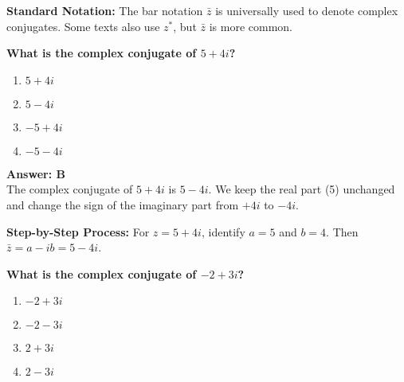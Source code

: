 \documentclass[12pt,a4paper]{article}
\begin{document}
\begin{conceptbox}
\textbf{Standard Notation:} The bar notation \( \bar{z} \) is universally used to denote complex conjugates. Some texts also use \( z^* \), but \( \bar{z} \) is more common.
\end{conceptbox}

\newpage
\begin{questiontitle}[MCQ 32]
\textbf{What is the complex conjugate of \( 5 + 4i \)?}
\end{questiontitle}

\begin{partbox}[Options]
\begin{enumerate}[label=\Alph*.]
    \item \( 5 + 4i \)
    \item \( 5 - 4i \)
    \item \( -5 + 4i \)
    \item \( -5 - 4i \)
\end{enumerate}
\end{partbox}

\begin{answerstyle}
\textbf{Answer: B} \\
The complex conjugate of \( 5 + 4i \) is \( 5 - 4i \). We keep the real part (5) unchanged and change the sign of the imaginary part from \( +4i \) to \( -4i \).
\end{answerstyle}

\begin{conceptbox}
\textbf{Step-by-Step Process:} For \( z = 5 + 4i \), identify \( a = 5 \) and \( b = 4 \). Then \( \bar{z} = a - ib = 5 - 4i \).
\end{conceptbox}

\newpage
\begin{questiontitle}[MCQ 33]
\textbf{What is the complex conjugate of \( -2 + 3i \)?}
\end{questiontitle}

\begin{partbox}[Options]
\begin{enumerate}[label=\Alph*.]
    \item \( -2 + 3i \)
    \item \( -2 - 3i \)
    \item \( 2 + 3i \)
    \item \( 2 - 3i \)
\end{enumerate}
\end{partbox}
\end{document}
